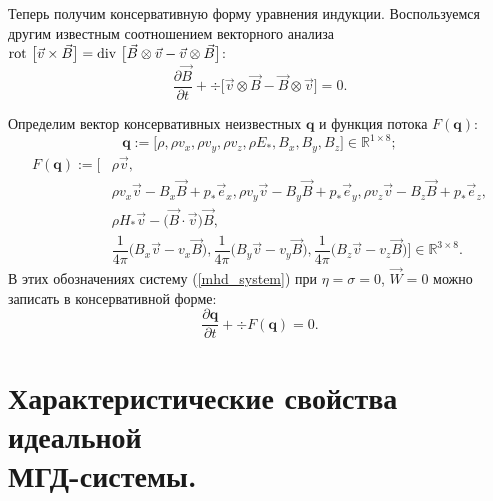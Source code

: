\documentclass[14pt, a4paper, fleqn]{extreport}
\begin{document}
    Теперь получим консервативную форму уравнения индукции.
    Воспользуемся другим известным соотношением векторного анализа \\
    $\text{rot }{\big[ \vec{v} \times \vec{B} \big]} 
        = \text{div }{\big[\vec{B}\otimes\vec{v}} - \vec{v}\otimes\vec{B}\big]$:
    \begin{equation*}
        \dfrac{\partial\vec{B}}{\partial t} 
            + \div{\big[ \vec{v}\otimes\vec{B} - \vec{B}\otimes\vec{v}} \big] = 0.
    \end{equation*}

    Определим вектор консервативных неизвестных $\textbf{q}$
    и функция потока $F(\textbf{q})$:
    \begin{equation*}
        \textbf{q} := \Big[ \rho, \rho v_x, \rho v_y, \rho v_z,
                           \rho E_*, B_x, B_y, B_z \Big] \in \mathbb{R}^{1 \times 8};     
    \end{equation*}
    \begin{equation*}
    \begin{split}
        F(\textbf{q}) := \Big[ 
            &\rho\vec{v}, \\
            &\rho v_x \vec{v} - B_x\vec{B} + p_*\vec{e}_x, 
             \rho v_y \vec{v} - B_y\vec{B} + p_*\vec{e}_y, 
             \rho v_z \vec{v} - B_z\vec{B} + p_*\vec{e}_z, \\
            &\rho H_* \vec{v} - \big( \vec{B} \cdot \vec{v} \big) \vec{B}, \\
            &\dfrac{1}{4\pi}\big( B_x\vec{v} - v_x\vec{B} \big), 
             \dfrac{1}{4\pi}\big( B_y\vec{v} - v_y\vec{B} \big), 
             \dfrac{1}{4\pi}\big( B_z\vec{v} - v_z\vec{B} \big) \Big] \in \mathbb{R}^{3 \times 8}.
    \end{split}
    \end{equation*}
    В этих обозначениях систему (\ref{mhd_system}) при $\eta = \sigma = 0$, $\vec{W} = 0$
    можно записать в консервативной форме:
    \begin{equation*}
        \dfrac{\partial \textbf{q}}{\partial t} + \div{F(\textbf{q})} = 0.
    \end{equation*}

    \section{Характеристические свойства идеальной \\
             МГД-системы.}
    
\end{document}
